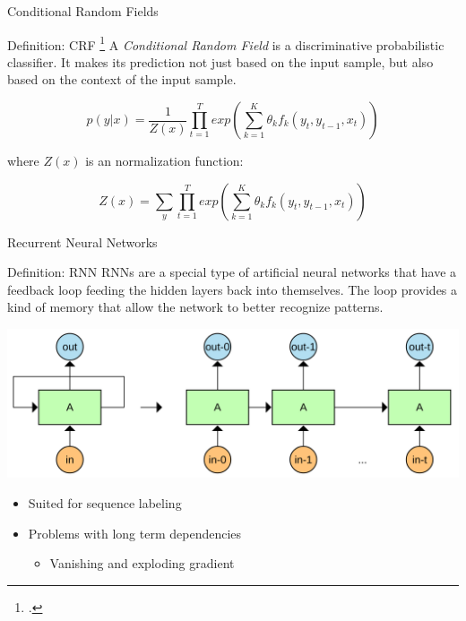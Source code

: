 \documentclass[12pt, tikz]{beamer}
\begin{document}
\begin{frame}[fragile]{Conditional Random Fields}
	\begin{block}{Definition: CRF \footcite{lafferty2001conditional}}
	A \textit{Conditional Random Field} is a discriminative probabilistic classifier. It makes its prediction not just based on the input sample, but also based on the context of the input sample.
	\end{block}
	\pause
	\vspace{-0.35cm}
	\begin{equation}
	p(y|x) = \frac{1}{Z(x)} \prod_{t=1}^T exp(\sum_{k=1}^{K} \theta_k f_k(y_t, y_{t-1}, x_t))
	\end{equation}

	where $Z(x)$ is an normalization function:

	\begin{equation}
	Z(x) = \sum_{y} \prod_{t=1}^{T} exp(\sum_{k=1}^{K} \theta_k f_k(y_t, y_{t-1}, x_t))
	\end{equation}
\end{frame}

\begin{frame}[fragile]{Recurrent Neural Networks}
	
	\begin{block}{Definition: RNN}
		RNNs are a special type of artificial neural networks that have a feedback loop feeding the hidden layers back into themselves. The loop provides a kind of memory that allow the network to better recognize patterns.
	\end{block}
	\pause
	\vspace{0.5cm}
	\begin{overprint}
		 \includegraphics[width=\linewidth]{img/rnn.png}
		\onslide<3->
		\begin{itemize}
			\item<3-> Suited for sequence labeling
			\item<4-> Problems with long term dependencies
			\begin{itemize}
				\item Vanishing and exploding gradient
			\end{itemize}
		\end{itemize}
	\end{overprint}

\end{frame}
\end{document}

